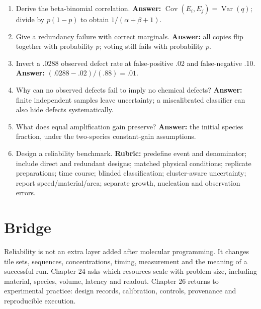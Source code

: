 \begin{enumerate}
\item Derive the beta-binomial correlation. \textbf{Answer:}
$\operatorname{Cov}(E_i,E_j)=\operatorname{Var}(q)$; divide by
$p(1-p)$ to obtain $1/(\alpha+\beta+1)$.
\item Give a redundancy failure with correct marginals. \textbf{Answer:} all
copies flip together with probability $p$; voting still fails with probability $p$.
\item Invert a .0288 observed defect rate at false-positive .02 and
false-negative .10. \textbf{Answer:} $(.0288-.02)/(.88)=.01$.
\item Why can no observed defects fail to imply no chemical defects?
\textbf{Answer:} finite independent samples leave uncertainty; a miscalibrated
classifier can also hide defects systematically.
\item What does equal amplification gain preserve? \textbf{Answer:} the
initial species fraction, under the two-species constant-gain assumptions.
\item Design a reliability benchmark. \textbf{Rubric:} predefine event and
denominator; include direct and redundant designs; matched physical conditions;
replicate preparations; time course; blinded classification; cluster-aware
uncertainty; report speed/material/area; separate growth, nucleation and observation
errors.
\end{enumerate}

\section{Bridge}
Reliability is not an extra layer added after molecular programming. It changes tile
sets, sequences, concentrations, timing, measurement and the meaning of a successful
run. Chapter 24 asks which resources scale with problem size, including material,
species, volume, latency and readout. Chapter 26 returns to experimental practice:
design records, calibration, controls, provenance and reproducible execution.
